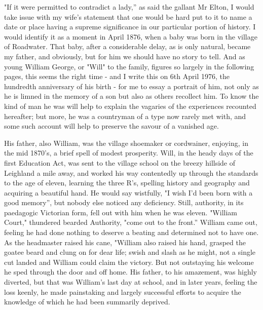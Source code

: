 
"If it were permitted to contradict a lady,” as said the gallant Mr Elton, I would take issue with my wife’s statement that one would be hard put to it to name a date or place having a supreme significance in our particular portion of history. I would identify it as a moment in April 1876, when a baby was born in the village of Roadwater. That baby, after a considerable delay, as is only natural, became my father, and obviously, but for him we should have no story to tell. And as young William George, or "Will" to the family, figures so largely in the following pages, this seems the right time - and I write this on 6th April 1976, the hundredth anniversary of his birth - for me to essay a portrait of him, not only as he is limned in the memory of a son but also as others recollect him. To know the kind of man he was will help to explain the vagaries of the experiences recounted hereafter; but more, he was a countryman of a type now rarely met with, and some such account will help to preserve the savour of a vanished age.

His father, also William, was the village shoemaker or cordwainer, enjoying, in the mid 1870’s, a brief spell of modest prosperity. Will, in the heady days of the first Education Act, was sent to the village school on the breezy hillside of Leighland a mile away, and worked his way contentedly up through the standards to the age of eleven, learning the three R’s, spelling history and geography and acquiring a beautiful hand. He would say wistfully, "I wish I’d been born with a good memory”, but nobody else noticed any deficiency. Still, authority, in its paedagogic Victorian form, fell out with him when he was eleven. "William Court," thundered bearded Authority, "come out to the front.” William came out, feeling he had done nothing to deserve a beating and determined not to have one. As the headmaster raised his cane, "William also raised his hand, grasped the goatee beard and clung on for dear life; swish and slash as he might, not a single cut landed and William could claim the victory. But not outstaying his welcome he sped through the door and off home. His father, to his amazement, was highly diverted, but that was William's last day at school, and in later years, feeling the loss keenly, he made painstaking and largely successful efforts to acquire the knowledge of which he had been summarily deprived.

